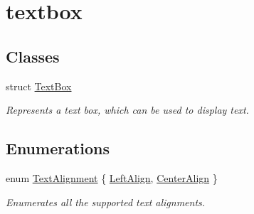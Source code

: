 \hypertarget{group__textbox}{}\section{textbox}
\label{group__textbox}
\subsection*{Classes}
\begin{DoxyCompactItemize}
\item 
struct \mbox{\hyperlink{struct_text_box}{Text\+Box}}
\begin{DoxyCompactList}\small\item\em Represents a text box, which can be used to display text. \end{DoxyCompactList}\end{DoxyCompactItemize}
\subsection*{Enumerations}
\begin{DoxyCompactItemize}
\item 
enum \mbox{\hyperlink{group__textbox_gaa56f1a82069b5feeadbb4591cb3e474f}{Text\+Alignment}} \{ \mbox{\hyperlink{group__textbox_ggaa56f1a82069b5feeadbb4591cb3e474fafc8c04fa2a5fd53f6e74b8327a6bf5f5}{Left\+Align}}, 
\mbox{\hyperlink{group__textbox_ggaa56f1a82069b5feeadbb4591cb3e474fa688bcbcbf29b99bd4614560bc2b17bdf}{Center\+Align}}
 \}
\begin{DoxyCompactList}\small\item\em Enumerates all the supported text alignments. \end{DoxyCompactList}\end{DoxyCompactItemize}
